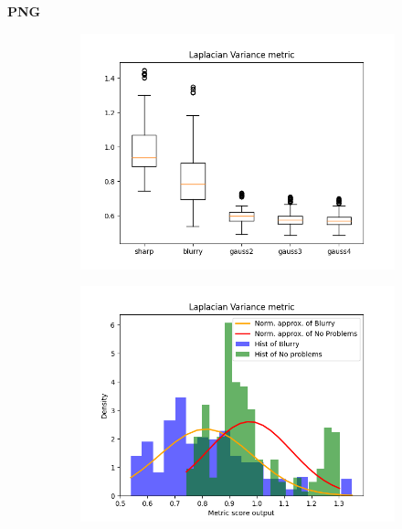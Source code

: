 \textbf{PNG}
\begin{figure}[H]
    \centering
    \begin{subfigure}[t]{0.48\textwidth}
        \includegraphics[width=\textwidth]{Figures/lv/output_boxplot_lv_png.png}
        \caption{}
        \label{fig:LV_roc}
    \end{subfigure}\hspace{1em}
    \begin{subfigure}[t]{0.48\textwidth}
	    \includegraphics[width=\textwidth]{Figures/lv/output_dens_lv_png.png}
	    \caption{}
	    \label{fig:LV_dens_png}
    \end{subfigure}\hspace{1em}


\end{figure}
